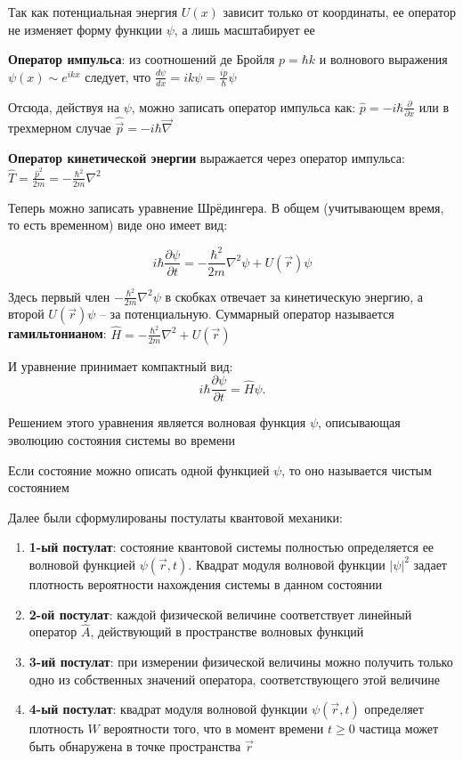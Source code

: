 Так как потенциальная энергия $U(x)$ зависит только от координаты, ее оператор не изменяет форму функции $\psi$, а лишь масштабирует ее

\textbf{Оператор импульса}: из соотношений де Бройля $p = \hbar k$ и волнового выражения $\psi(x) \sim e^{ikx}$ следует, что $\frac{d\psi}{dx} = i k \psi = \frac{i p}{\hbar}\psi$

Отсюда, действуя на $\psi$, можно записать оператор импульса как: $\hat{p} = - i \hbar \frac{\partial}{\partial x}$ или в трехмерном случае $\hat{\vec{p}} = - i \hbar \vec{\nabla}$

\textbf{Оператор кинетической энергии} выражается через оператор импульса: $\hat{T} = \frac{\hat{p}^2}{2m} = -\frac{\hbar^2}{2m}\nabla^2$

\mediumvspace

Теперь можно записать уравнение Шрёдингера. В общем (учитывающем время, то есть временном) виде оно имеет вид:

\[
i\hbar \frac{\partial \psi}{\partial t} = -\frac{\hbar^2}{2m}\nabla^2 \psi + U(\vec r)\psi
\]

Здесь первый член $-\frac{\hbar^2}{2m}\nabla^2 \psi$ в скобках отвечает за кинетическую энергию, а второй $U(\vec r) \psi$ -- за потенциальную. Суммарный оператор называется \textbf{гамильтонианом}: $\hat{H} = -\frac{\hbar^2}{2m}\nabla^2 + U(\vec r)$

И уравнение принимает компактный вид:
\[
i\hbar \frac{\partial \psi}{\partial t} = \hat{H}\psi.
\]

\mediumvspace

Решением этого уравнения является волновая функция $\psi$, описывающая эволюцию состояния системы во времени

Если состояние можно описать одной функцией $\psi$, то оно называется чистым состоянием

\mediumvspace

Далее были сформулированы постулаты квантовой механики:

\begin{enumerate}
    \item \textbf{1-ый постулат}: 
    состояние квантовой системы полностью определяется ее волновой функцией $\psi(\vec r, t)$.  
    Квадрат модуля волновой функции $|\psi|^2$ задает плотность вероятности нахождения системы в данном состоянии
    
    \item \textbf{2-ой постулат}:
    каждой физической величине соответствует линейный оператор $\hat{A}$, действующий в пространстве волновых функций
    
    \item \textbf{3-ий постулат}: 
    при измерении физической величины можно получить только одно из собственных значений оператора, соответствующего этой величине
    
    \item \textbf{4-ый постулат}:
    квадрат модуля волновой функции $\psi(\vec r, t)$
    определяет плотность $W$ вероятности того, что в момент времени $t \geq 0$ частица может быть обнаружена в точке пространства $\vec r$ 
\end{enumerate}

